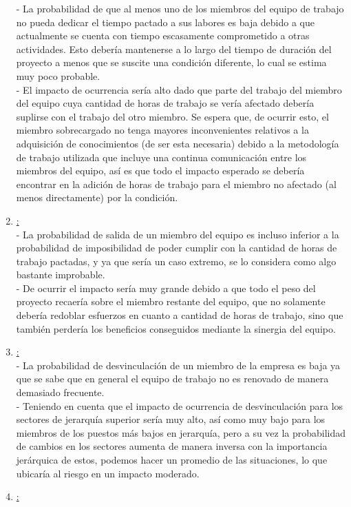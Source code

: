 \documentclass[a4paper, 12pt,twoside]{report}  %
\numberwithin{equation}{subsection} %
\begin{document}
\begin{enumerate}
	- La probabilidad de que al menos uno de los miembros del equipo de trabajo no pueda dedicar el tiempo pactado a sus labores es baja debido a que actualmente se cuenta con tiempo escasamente comprometido a otras actividades. Esto debería mantenerse a lo largo del tiempo de duración del proyecto a menos que se suscite una condición diferente, lo cual se estima muy poco probable.\\
	- El impacto de ocurrencia sería alto dado que parte del trabajo del miembro del equipo cuya cantidad de horas de trabajo se vería afectado debería suplirse con el trabajo del otro miembro. Se espera que, de ocurrir esto, el miembro sobrecargado no tenga mayores inconvenientes relativos a la adquisición de conocimientos (de ser esta necesaria) debido a la metodología de trabajo utilizada que incluye una continua comunicación entre los miembros del equipo, así es que todo el impacto esperado se debería encontrar en la adición de horas de trabajo para el miembro no afectado (al menos directamente) por la condición.
	\item \underline{:}\\
	- La probabilidad de salida de un miembro del equipo es incluso inferior a la probabilidad de imposibilidad de poder cumplir con la cantidad de horas de trabajo pactadas, y ya que sería un caso extremo, se lo considera como algo bastante improbable.\\
	- De ocurrir el impacto sería muy grande debido a que todo el peso del proyecto recaería sobre el miembro restante del equipo, que no solamente debería redoblar esfuerzos en cuanto a cantidad de horas de trabajo, sino que también perdería los beneficios conseguidos mediante la sinergia del equipo.
	\item \underline{:}\\
	- La probabilidad de desvinculación de un miembro de la empresa es baja ya que se sabe que en general el equipo de trabajo no es renovado de manera demasiado frecuente.\\
	- Teniendo en cuenta que el impacto de ocurrencia de desvinculación para los sectores de jerarquía superior sería muy alto, así como muy bajo para los miembros de los puestos más bajos en jerarquía, pero a su vez la probabilidad de cambios en los sectores aumenta de manera inversa con la importancia jerárquica de estos, podemos hacer un promedio de las situaciones, lo que ubicaría al riesgo en un impacto moderado.
	\item \underline{:}\\

\end{enumerate}
\end{document}

